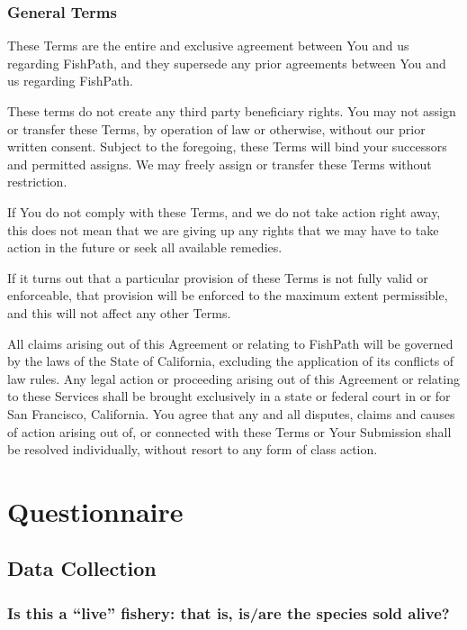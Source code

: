 \documentclass[11pt,]{book}
\begin{document}
\hypertarget{general-terms}{%
\subsection*{General Terms}\label{general-terms}}

These Terms are the entire and exclusive agreement between You and us
regarding FishPath, and they supersede any prior agreements between You
and us regarding FishPath.

These terms do not create any third party beneficiary rights. You may
not assign or transfer these Terms, by operation of law or otherwise,
without our prior written consent. Subject to the foregoing, these Terms
will bind your successors and permitted assigns. We may freely assign or
transfer these Terms without restriction.

If You do not comply with these Terms, and we do not take action right
away, this does not mean that we are giving up any rights that we may
have to take action in the future or seek all available remedies.

If it turns out that a particular provision of these Terms is not fully
valid or enforceable, that provision will be enforced to the maximum
extent permissible, and this will not affect any other Terms.

All claims arising out of this Agreement or relating to FishPath will be
governed by the laws of the State of California, excluding the
application of its conflicts of law rules. Any legal action or
proceeding arising out of this Agreement or relating to these Services
shall be brought exclusively in a state or federal court in or for San
Francisco, California. You agree that any and all disputes, claims and
causes of action arising out of, or connected with these Terms or Your
Submission shall be resolved individually, without resort to any form of
class action.

\hypertarget{questionnaire}{%
\chapter{Questionnaire}\label{questionnaire}}

\hypertarget{data-collection}{%
\section{Data Collection}\label{data-collection}}

\hypertarget{is-this-a-live-fishery-that-is-isare-the-species-sold-alive}{%
\subsection*{Is this a ``live'' fishery: that is, is/are the species
sold
alive?}\label{is-this-a-live-fishery-that-is-isare-the-species-sold-alive}}
\end{document}
